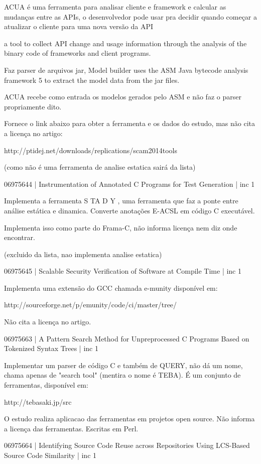 \documentclass[12pt]{article}
\begin{document}
ACUA é uma ferramenta para analisar cliente e framework e calcular as mudanças
entre as APIs, o desenvolvedor pode usar pra decidir quando começar a
atualizar o cliente para uma nova versão da API

a tool to collect API change and usage information
through the analysis of the binary code of frameworks and
client programs.

Faz parser de arquivos jar, Model builder uses the ASM Java bytecode analysis
framework 5 to extract the model data from the jar files.

ACUA recebe como entrada os modelos gerados pelo ASM e não faz o parser
propriamente dito.

Fornece o link abaixo para obter a ferramenta e os dados do estudo, mas não
cita a licença no artigo:

http://ptidej.net/downloads/replications/scam2014tools

(como não é uma ferramenta de analise estatica sairá da lista)

06975644 | Instrumentation of Annotated C Programs for Test Generation | inc 1

Implementa a ferramenta S TA D Y , uma ferramenta que faz a ponte entre
análise estática e dinamica. Converte anotações E-ACSL em código C executável.

Implementa isso como parte do Frama-C, não informa licença nem diz onde
encontrar.

(excluido da lista, nao implementa analise estatica)

06975645 | Scalable Security Verification of Software at Compile Time | inc 1

Implementa uma extensão do GCC chamada e-munity disponível em:

http://sourceforge.net/p/emunity/code/ci/master/tree/

Não cita a licença no artigo.

06975663 | A Pattern Search Method for Unpreprocessed C Programs Based on Tokenized Syntax Trees | inc 1

Implementar um parser de código C e também de QUERY, não dá um nome, chama
apenas de "search tool" (mentira o nome é TEBA). É um conjunto de ferramentas, disponível em:

http://tebasaki.jp/src

O estudo realiza aplicacao das ferramentas em projetos open source. Não
informa a licença das ferramentas. Escritas em Perl.

06975664 | Identifying Source Code Reuse across Repositories Using LCS-Based Source Code Similarity | inc 1
\end{document}
